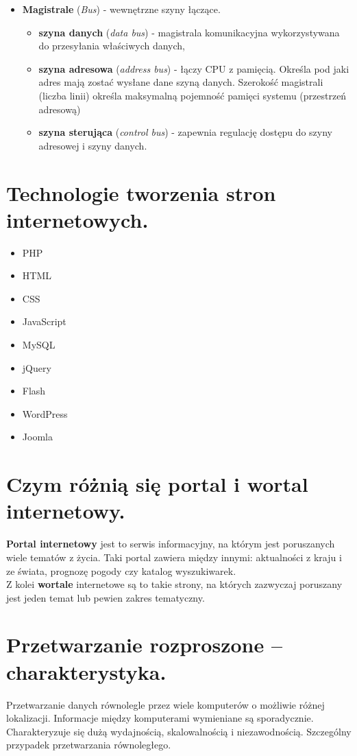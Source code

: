 \documentclass[12pt,a4paper]{article}
\begin{document}
\begin{itemize}
		\item \textbf{Magistrale} (\textit{Bus}) - wewnętrzne szyny łączące.
		\begin{itemize}
			\item \textbf{szyna danych} (\textit{data bus}) - magistrala komunikacyjna wykorzystywana do przesyłania właściwych danych,
			\item \textbf{szyna adresowa} (\textit{address bus}) - łączy CPU z pamięcią. Określa pod jaki adres mają zostać wysłane dane szyną danych. Szerokość magistrali (liczba linii) określa maksymalną pojemność pamięci systemu (przestrzeń adresową)
			\item \textbf{szyna sterująca} (\textit{control bus}) - zapewnia regulację dostępu do szyny adresowej i szyny danych.
		\end{itemize}
	\end{itemize}

	\section{Technologie tworzenia stron internetowych.}
		\begin{multicols}{2}
		\begin{itemize}
			\item PHP
			\item HTML
			\item CSS
			\item JavaScript
			\item MySQL
			\item jQuery
			\item Flash
			\item WordPress
			\item Joomla
		\end{itemize}
	\end{multicols}

	\section{Czym różnią się portal i wortal internetowy.}
	\textbf{Portal internetowy} jest to serwis informacyjny, na którym jest poruszanych wiele tematów z życia. Taki portal zawiera między innymi: aktualności z kraju i ze świata, prognozę pogody czy katalog wyszukiwarek.\\
	Z kolei \textbf{wortale} internetowe są to takie strony, na których zazwyczaj poruszany jest jeden temat lub pewien zakres tematyczny.

	\section{Przetwarzanie rozproszone – charakterystyka.}
	Przetwarzanie danych równolegle przez wiele komputerów o możliwie różnej lokalizacji. Informacje między komputerami wymieniane są sporadycznie. Charakteryzuje się dużą wydajnością, skalowalnością i niezawodnością. Szczególny przypadek przetwarzania równoległego.
\end{document}

